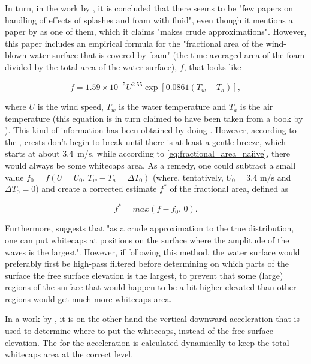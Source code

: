 In turn, in the work by \citet{Takahashi2003}, it is concluded that there seems to be "few papers on handling of effects of splashes and foam with fluid", even though it mentions a paper by \citet{Premovze2001} as one of them, which it claims "makes crude approximations". However, this paper includes an empirical formula for the "fractional area of the wind-blown water surface that is covered by foam" (the time-averaged area of the foam divided by the total area of the water surface), $f$, that looks like

\begin{equation} \label{eq:fractional_area_naiive}
f = 1.59 \times 10^{-5}U^{2.55}\exp[0.0861(T_w - T_a)],
\end{equation}

where $U$ is the wind speed, $T_w$ is the water temperature and $T_a$ is the air temperature (this equation is in turn claimed to have been taken from a book by \citet{Monahan1986}). This kind of information has been obtained by doing . However, according to the , crests don't begin to break until there is at least a gentle breeze, which starts at about \mbox{3.4 m/s}, while according to \eqref{eq:fractional_area_naiive}, there would always be some whitecaps area. As a remedy, one could subtract a small value ${f_0 = f(U=U_0,\, T_w-T_a=\Delta T_0)}$ (where, tentatively, ${U_0 = 3.4\text{ m/s}}$ and ${\Delta T_0 = 0}$) and create a corrected estimate $f^*$ of the fractional area, defined as

\begin{equation}
f^* = max(f-f_0,\,0).
\end{equation}

Furthermore, \citeauthor{Premovze2001} suggests that "as a crude approximation to the true distribution, one can put whitecaps at positions on the surface where the amplitude of the waves is the largest". However, if following this method, the water surface would preferably first be high-pass filtered before determining on which parts of the surface the free surface elevation is the largest, to prevent that some (large) regions of the surface that would happen to be a bit higher elevated than other regions would get much more whitecaps area.

In a work by \citet{Monnier}, it is on the other hand the vertical downward acceleration that is used to determine where to put the whitecaps, instead of the free surface elevation. The \threshold for the acceleration is calculated dynamically to keep the total whitecaps area at the correct level. 

